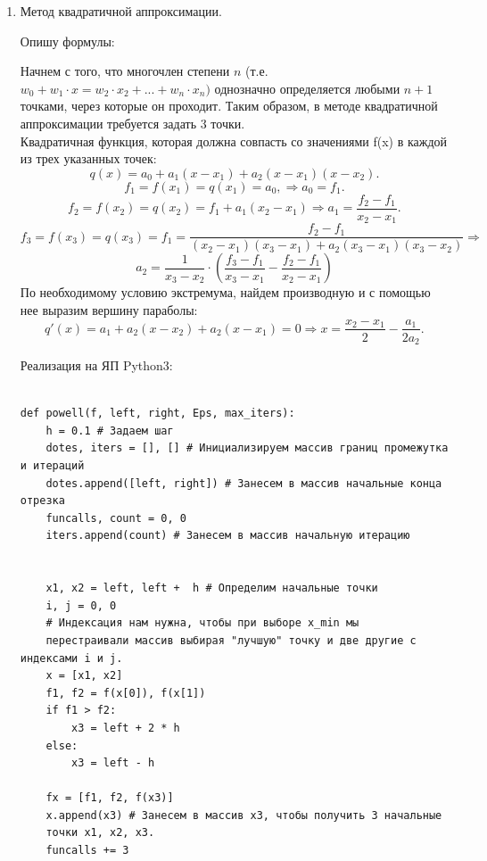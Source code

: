 \documentclass[10pt]{article}
\begin{document}
\begin{enumerate}
\item
\begin{center}
\begin{large}
Метод квадратичной аппроксимации.\\
\end{large}
\end{center}
\begin{center}
Опишу формулы:\\
\end{center}
Начнем с того, что многочлен степени $n$ (т.е. $w_0 + w_1\cdot x = w_2\cdot x_2 + ... + w_n\cdot x_n)$ однозначно определяется любыми $n + 1$ точками, через которые он проходит. Таким образом, в методе квадратичной аппроксимации требуется задать 3 точки.\\
Квадратичная функция, которая должна совпасть со значениями f(x) в каждой из трех указанных точек:
\[q(x) = a_0 + a_1(x - x_1) + a_2(x-x_1)(x-x_2) .\]
\[f_1 = f(x_1) = q(x_1) = a_0,\Rightarrow a_0 = f_1.\]
\[f_2 = f(x_2) = q(x_2) = f_1 + a_1(x_2-x_1)\Rightarrow a_1 = \frac{f_2 - f_1}{x_2 - x_1}.\]
\[f_3 = f(x_3) = q(x_3) = f_1 = \frac{f_2 - f_1}{(x_2 - x_1)(x_3-x_1) + a_2(x_3-x_1)(x_3-x_2)}\Rightarrow\]
\[ a_2 = \frac{1}{x_3-x_2}\cdot \left(\frac{f_3-f_1}{x_3-x_1} - \frac{f_2-f_1}{x_2-x_1}\right)\]
По необходимому условию экстремума, найдем производную и с помощью нее выразим вершину параболы:
\[q'(x) = a_1 + a_2(x-x_2) + a_2(x-x_1) = 0\Rightarrow x = \frac{x_2 - x_1}{2} - \frac{a_1}{2a_2}.\]
\begin{center}
Реализация на ЯП Python3:\\
\end{center}
\begin{verbatim}

def powell(f, left, right, Eps, max_iters):
    h = 0.1 # Задаем шаг
    dotes, iters = [], [] # Инициализируем массив границ промежутка и итераций
    dotes.append([left, right]) # Занесем в массив начальные конца отрезка   
    funcalls, count = 0, 0
    iters.append(count) # Занесем в массив начальную итерацию
    
    
    x1, x2 = left, left +  h # Определим начальные точки
    i, j = 0, 0 
    # Индексация нам нужна, чтобы при выборе x_min мы 
    перестраивали массив выбирая "лучшую" точку и две другие с индексами i и j.
    x = [x1, x2]
    f1, f2 = f(x[0]), f(x[1])
    if f1 > f2:
        x3 = left + 2 * h
    else:
        x3 = left - h
    
    fx = [f1, f2, f(x3)]
    x.append(x3) # Занесем в массив x3, чтобы получить 3 начальные 
    точки x1, x2, x3.
    funcalls += 3
    

\end{verbatim}
\end{enumerate}
\end{document}

